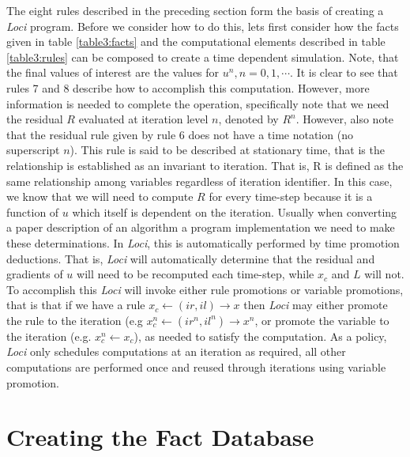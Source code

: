 \documentclass[10pt,epsf,letterpaper,twoside]{book}
\begin{document}
The eight rules described in the preceding section form the basis of
creating a {\it Loci} program.  Before we consider how to do this, lets
first consider how the facts given in table \ref{table3:facts} and the
computational elements described in table \ref{table3:rules} can be
composed to create a time dependent simulation.  Note, that the final
values of interest are the values for $u^n, n=0,1, \cdots$.  It is
clear to see that rules 7 and 8 describe how to accomplish this
computation.  However, more information is needed to complete the
operation, specifically note that we need the residual $R$ evaluated
at iteration level $n$, denoted by $R^n$.  However, also note that the
residual rule given by rule 6 does not have a time notation (no
superscript $n$).  This rule is said to be described at stationary
time, that is the relationship is established as an invariant to
iteration.  That is, R is defined as the same relationship among
variables regardless of iteration identifier.  In this case, we know
that we will need to compute $R$ for every time-step because it is a
function of $u$ which itself is dependent on the iteration.  Usually
when converting a paper description of an algorithm a program
implementation we need to make these determinations.  In {\it Loci}, this is
automatically performed by time promotion deductions.  That is, {\it Loci}
will automatically determine that the residual and gradients of $u$
will need to be recomputed each time-step, while $x_c$ and $L$ will
not.  To accomplish this {\it Loci} will invoke either rule promotions or
variable promotions, that is that if we have a rule
$x_c\leftarrow(ir,il)\rightarrow x$ then {\it Loci} may either promote the
rule to the iteration (e.g $x_c^n\leftarrow(ir^n,il^n)\rightarrow
x^n$, or promote the variable to the iteration (e.g. $x_c^n\leftarrow
x_c$), as needed to satisfy the computation.  As a policy, {\it Loci} only
schedules computations at an iteration as required, all other
computations are performed once and reused through iterations using
variable promotion.

\section{Creating the Fact Database}
\end{document}
